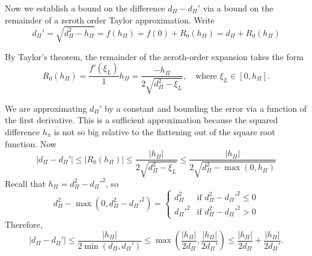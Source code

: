 Now we establish a bound on the difference $d_{\Pi}-d_{\Pi}'$ via a bound on the remainder of a
zeroth order Taylor approximation.  Write
\begin{equation*}
  d_{\Pi}' = \sqrt{d_{\Pi}^2-h_{\Pi}} = f(h_{\Pi}) = f(0) + R_0(h_{\Pi}) = d_{\Pi} + R_0(h_{\Pi})
\end{equation*}

By Taylor's theorem, the remainder of the zeroth-order expansion takes the form 
\begin{equation*}
  R_0(h_{\Pi}) = \frac{f'(\xi_L)}{1}h_{\Pi} = \frac{-h_{\Pi}}{2\sqrt{d_{\Pi}^2-\xi_L}}, \quad
  \text{where } \xi_L \in [0, h_{\Pi}].
\end{equation*}

We are approximating $d_{\Pi}'$ by a constant and bounding the error via a function of the first
derivative.  This is a sufficient approximation because the squared difference $h_{\pi}$ is not so
big relative to the flattening out of the square root function.
Now
\begin{equation*}
  |d_{\Pi}-d_{\Pi}'| \leq |R_0(h_{\Pi})| \leq \frac{|h_{\Pi}|}{2\sqrt{d_{\Pi}^2-\xi_L}} \leq
  \frac{|h_{\Pi}|}{2\sqrt{d_{\Pi}^2-\max(0, h_{\Pi})}}
\end{equation*}
Recall that $h_{\Pi} = d_{\Pi}^2 - d_{\Pi}'^2$, so 
\begin{equation*}
  d_{\Pi}^2-\max(0, d_{\Pi}^2-d_{\Pi}'^2) = 
  \begin{cases}
    d_{\Pi}^2 & \text{if } d_{\Pi}^2-d_{\Pi}'^2 \leq 0 \\
    d_{\Pi}'^2 & \text{if } d_{\Pi}^2-d_{\Pi}'^2 > 0
  \end{cases}  
\end{equation*}
Therefore, 
\begin{equation*}
  |d_{\Pi}-d_{\Pi}'| \leq \frac{|h_{\Pi}|}{2\min(d_{\Pi}, d_{\Pi}')} \leq \max \left (
    \frac{|h_{\Pi}|}{2d_{\Pi}}, \frac{|h_{\Pi}|}{2d_{\Pi}'} \right ) \leq 
  \frac{|h_{\Pi}|}{2d_{\Pi}} +  \frac{|h_{\Pi}|}{2d_{\Pi}'}.
\end{equation*}


